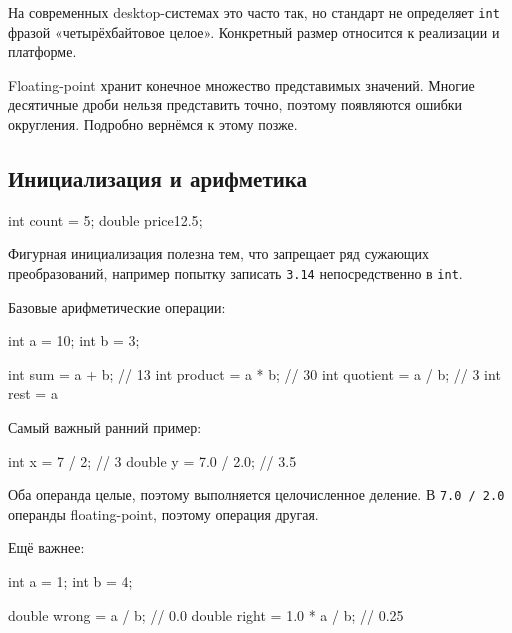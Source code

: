 \begin{standardbox}[Не запоминаем int = 4 байта как закон языка]
На современных desktop-системах это часто так, но стандарт не определяет
\texttt{int} фразой «четырёхбайтовое целое». Конкретный размер относится к
реализации и платформе.
\end{standardbox}

\begin{warningbox}
Floating-point хранит конечное множество представимых значений. Многие
десятичные дроби нельзя представить точно, поэтому появляются ошибки
округления. Подробно вернёмся к этому позже.
\end{warningbox}

\subsection{Инициализация и арифметика}

\begin{cppcode}
int count = 5;
double price{12.5};
\end{cppcode}

Фигурная инициализация полезна тем, что запрещает ряд сужающих преобразований,
например попытку записать \texttt{3.14} непосредственно в \texttt{int}.

Базовые арифметические операции:

\begin{cppcode}
int a = 10;
int b = 3;

int sum = a + b;       // 13
int product = a * b;   // 30
int quotient = a / b;  // 3
int rest = a %
\end{cppcode}

Самый важный ранний пример:

\begin{cppcode}
int x = 7 / 2;         // 3
double y = 7.0 / 2.0; // 3.5
\end{cppcode}

\begin{whybox}
Оба операнда целые, поэтому выполняется целочисленное деление.
В \texttt{7.0 / 2.0} операнды floating-point, поэтому операция другая.
\end{whybox}

Ещё важнее:

\begin{cppcode}
int a = 1;
int b = 4;

double wrong = a / b;       // 0.0
double right = 1.0 * a / b; // 0.25
\end{cppcode}

